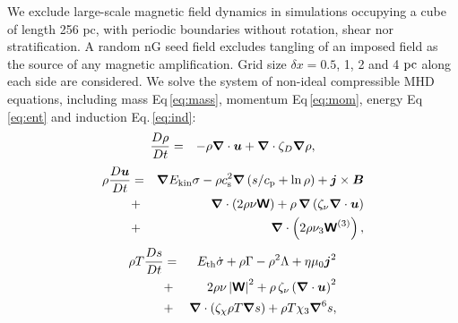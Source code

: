 \documentclass[preprint2]{aastex63}
\newcommand\ESK{E_{\rm kin}}
\newcommand\EST{E_{\rm th}}
\newcommand{\vect}[1]{{{\mbox{\boldmath $#1$}}}}%
\newcommand{\mathbfss}[1]{\textbf{\textsf{#1}}}
\newcommand\pc{~ {\rm pc}}
\begin{document}
 We exclude large-scale magnetic field dynamics in simulations occupying 
 a cube of length 256 pc, with periodic boundaries without 
 rotation, shear nor stratification.
 A random nG seed field excludes tangling of an imposed field as the 
 source of any magnetic amplification.
 Grid size $\delta x=0.5$, 1, 2 and 4$\pc$  along each side are considered.
 We solve the system of non-ideal compressible MHD equations, including mass
 Eq\,\eqref{eq:mass}, momentum Eq\,\eqref{eq:mom}, energy Eq\,\eqref{eq:ent}
 and induction Eq.\,\eqref{eq:ind}:
  \begin{eqnarray}
  \label{eq:mass}
    \frac{D\rho}{Dt} &=& 
    -\rho \vect\nabla \cdot \vect{u}
    +\vect\nabla \cdot\zeta_D\vect\nabla\rho,
  \end{eqnarray}
  \begin{eqnarray}
  \label{eq:mom}
    \rho\frac{D\vect{u}}{Dt} &=& 
    \vect\nabla{\ESK\sigma}
    -\rho c_{\rm s}^2\vect\nabla\left({s}/{c_{\rm p}}+\ln\rho\right)
    +\vect{j}\times\vect{B}
    \nonumber\\
    &+&\vect\nabla\cdot \left(2\rho\nu{\mathbfss W}\right)
    +\rho\,\vect\nabla\left(\zeta_{\nu}\vect\nabla \cdot \vect{u} \right)
    \nonumber\\
    &+&\vect\nabla\cdot \left(2\rho\nu_3{\mathbfss W}^{(3)}\right),
  \end{eqnarray}
  \begin{eqnarray}
  \label{eq:ent}
    \rho T\frac{D s}{Dt} &=&
     \EST\dot\sigma +\rho\Gamma
    -\rho^2\Lambda +\eta\mu_0\vect{j}^2 
    \nonumber\\
    &+&2 \rho \nu\left|{\mathbfss W}\right|^{2}
    +\rho\,\zeta_{\nu}\left(\vect\nabla \cdot \vect{u} \right)^2
    \nonumber\\
    &+&\vect\nabla\cdot\left(\zeta_\chi\rho T\vect\nabla s\right)
    +\rho T\chi_3\vect\nabla^6 s,
  \end{eqnarray}
\end{document}
